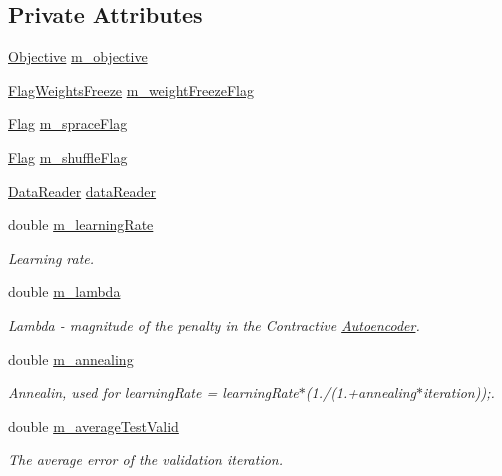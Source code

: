 \subsection*{Private Attributes}
\begin{DoxyCompactItemize}
\item 
\hyperlink{classObjective}{Objective} \hyperlink{classTrainingAlgorithm_af9cc77a25cd1c116fb12f89a04d704a6}{m\+\_\+objective}
\item 
\hyperlink{classTrainingAlgorithm_ad160a74aa55053d54ab4c25840d778a2}{Flag\+Weights\+Freeze} \hyperlink{classTrainingAlgorithm_a19383d774b744bb32c092c7892c92998}{m\+\_\+weight\+Freeze\+Flag}
\item 
\hyperlink{classTrainingAlgorithm_acf5a98433c4e0a2fa4ab3d294b343752}{Flag} \hyperlink{classTrainingAlgorithm_a22d150f15f730ae139a8267cea153a3e}{m\+\_\+sprace\+Flag}
\item 
\hyperlink{classTrainingAlgorithm_acf5a98433c4e0a2fa4ab3d294b343752}{Flag} \hyperlink{classTrainingAlgorithm_a2c5345e01d68a30577105f0f82014585}{m\+\_\+shuffle\+Flag}
\item 
\hyperlink{classDataReader}{Data\+Reader} \hyperlink{classTrainingAlgorithm_a79d1135058e08e7f0bc2ca3d7fabd777}{data\+Reader}
\item 
double \hyperlink{classTrainingAlgorithm_abcc97ba6220839e3f24a5692e8fdd2b3}{m\+\_\+learning\+Rate}
\begin{DoxyCompactList}\small\item\em Learning rate. \end{DoxyCompactList}\item 
double \hyperlink{classTrainingAlgorithm_a774f82d6c26effaa909c40c9e24b8e48}{m\+\_\+lambda}
\begin{DoxyCompactList}\small\item\em Lambda -\/ magnitude of the penalty in the Contractive \hyperlink{classAutoencoder}{Autoencoder}. \end{DoxyCompactList}\item 
double \hyperlink{classTrainingAlgorithm_a6a3f866fd846b14fa8065d18287e93a9}{m\+\_\+annealing}
\begin{DoxyCompactList}\small\item\em Annealin, used for learning\+Rate = learning\+Rate$\ast$(1./(1.+annealing$\ast$iteration));. \end{DoxyCompactList}\item 
double \hyperlink{classTrainingAlgorithm_a33cb16c48262985040967e045c75bff3}{m\+\_\+average\+Test\+Valid}
\begin{DoxyCompactList}\small\item\em The average error of the validation iteration. \end{DoxyCompactList}\item 

\end{DoxyCompactItemize}
